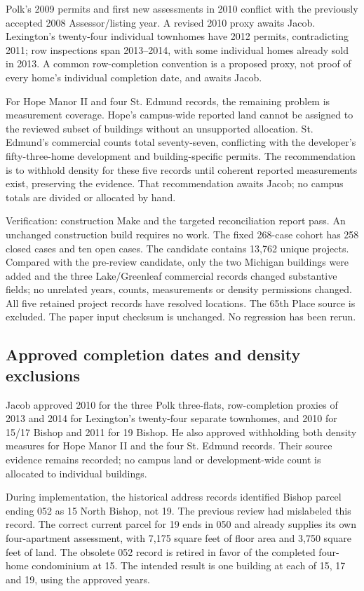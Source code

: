 Polk's 2009 permits and first new assessments in 2010 conflict with the previously accepted 2008 Assessor/listing year. A revised 2010 proxy awaits Jacob. Lexington's twenty-four individual townhomes have 2012 permits, contradicting 2011; row inspections span 2013--2014, with some individual homes already sold in 2013. A common row-completion convention is a proposed proxy, not proof of every home's individual completion date, and awaits Jacob.

For Hope Manor II and four St. Edmund records, the remaining problem is measurement coverage. Hope's campus-wide reported land cannot be assigned to the reviewed subset of buildings without an unsupported allocation. St. Edmund's commercial counts total seventy-seven, conflicting with the developer's fifty-three-home development and building-specific permits. The recommendation is to withhold density for these five records until coherent reported measurements exist, preserving the evidence. That recommendation awaits Jacob; no campus totals are divided or allocated by hand.

Verification: construction Make and the targeted reconciliation report pass. An unchanged construction build requires no work. The fixed 268-case cohort has 258 closed cases and ten open cases. The candidate contains 13,762 unique projects. Compared with the pre-review candidate, only the two Michigan buildings were added and the three Lake/Greenleaf commercial records changed substantive fields; no unrelated years, counts, measurements or density permissions changed. All five retained project records have resolved locations. The 65th Place source is excluded. The paper input checksum is unchanged. No regression has been rerun.


\subsection*{Approved completion dates and density exclusions}
Jacob approved 2010 for the three Polk three-flats, row-completion proxies of 2013 and 2014 for Lexington's twenty-four separate townhomes, and 2010 for 15/17 Bishop and 2011 for 19 Bishop. He also approved withholding both density measures for Hope Manor II and the four St. Edmund records. Their source evidence remains recorded; no campus land or development-wide count is allocated to individual buildings.

During implementation, the historical address records identified Bishop parcel ending 052 as 15 North Bishop, not 19. The previous review had mislabeled this record. The correct current parcel for 19 ends in 050 and already supplies its own four-apartment assessment, with 7,175 square feet of floor area and 3,750 square feet of land. The obsolete 052 record is retired in favor of the completed four-home condominium at 15. The intended result is one building at each of 15, 17 and 19, using the approved years.

